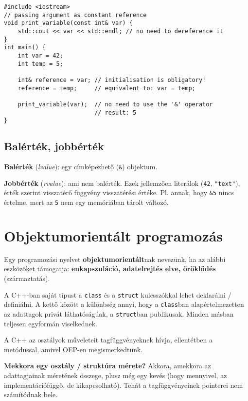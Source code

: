 \documentclass[a4paper, 11pt, oneside]{book}
\begin{document}
\begin{lstlisting}[style=cppstyle]
#include <iostream>
// passing argument as constant reference
void print_variable(const int& var) {
	std::cout << var << std::endl; // no need to dereference it
}
int main() {
	int var = 42;
	int temp = 5;
	
	int& reference = var; // initialisation is obligatory!
	reference = temp;	  // equivalent to: var = temp;
	
	print_variable(var);  // no need to use the '&' operator
						  // result: 5
}
\end{lstlisting}


\section{Balérték, jobbérték}

\textbf{Balérték} (\textit{lvalue}): egy címképezhető (\verb*|&|) objektum.

\textbf{Jobbérték} (\textit{rvalue}): ami nem balérték. Ezek jellemzően literálok (\verb*|42|, \verb*|"text"|), érték szerint visszatérő függvény visszatérési értéke. Pl. annak, hogy \verb*|&5| nincs értelme, mert az \verb*|5| nem egy memóriában tárolt változó.

\chapter{Objektumorientált programozás}

\begin{tcolorbox}[title=Objektumorientált programozási nyelv]
	Egy programozási nyelvet \textbf{objektumorientált}nak nevezünk, ha az alábbi eszközöket támogatja: \textbf{enkapszuláció, adatelrejtés elve, öröklődés} (származtatás).
\end{tcolorbox}

A C++-ban saját típust a \verb*|class| és a \verb*|struct| kulcsszókkal lehet deklarálni / definiálni. A kettő között a különbség annyi, hogy a \verb*|class|ban alapértelmezetten az adattagok privát láthatóságúak, a \verb*|struct|ban publikusak. Minden másban teljesen egyformán viselkednek.

A C++ az osztályok műveleteit tagfüggvényeknek hívja, ellentétben a metódussal, amivel OEP-en megismerkedtünk.

\textbf{Mekkora egy osztály / struktúra mérete?} Akkora, amekkora az adattagjainak méretének összege, plusz még egy kevés (hogy mennyivel, az implementációfüggő, de kikapcsolható). Tehát a tagfüggvényeinek pointerei nem számítódnak bele. 
\end{document}
